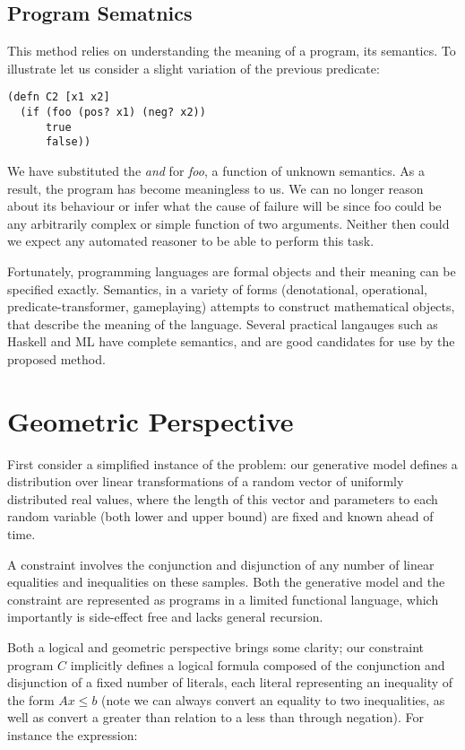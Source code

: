 \subsection{Program Sematnics}
This method relies on understanding the meaning of a program, its semantics.
To illustrate let us consider a slight variation of the previous predicate:

\begin{verbatim}
(defn C2 [x1 x2]
  (if (foo (pos? x1) (neg? x2)) 
      true                        
      false))
\end{verbatim}

We have substituted the \textit{and} for \textit{foo}, a function of unknown semantics.
As a result, the program has become meaningless to us.
We can no longer reason about its behaviour or infer what the cause of failure will be since foo could be any arbitrarily complex or simple function of two arguments.
Neither then could we expect any automated reasoner to be able to perform this task.

Fortunately, programming languages are formal objects and their meaning can be specified exactly.
Semantics, in a variety of forms (denotational, operational, predicate-transformer, gameplaying) attempts to construct mathematical objects, that describe the meaning of the language.
Several practical langauges such as Haskell and ML have complete semantics, and are good candidates for use by the proposed method.

\section{Geometric Perspective}

First consider a simplified instance of the problem: our generative model defines a distribution over linear transformations of a random vector of uniformly distributed real values, where the length of this vector and parameters to each random variable (both lower and upper bound) are fixed and known ahead of time.

A constraint involves the conjunction and disjunction of any number of linear equalities and inequalities on these samples.
Both the generative model and the constraint are represented as programs in a limited functional language, which importantly is side-effect free and lacks general recursion.

Both a logical and geometric perspective brings some clarity; our constraint program $C$ implicitly defines a logical formula composed of the conjunction and disjunction of a fixed number of literals, each literal representing an inequality of the form $Ax \le b$ (note we can always convert an equality to two inequalities, as well as convert a greater than relation to a less than through negation).
For instance the expression:


